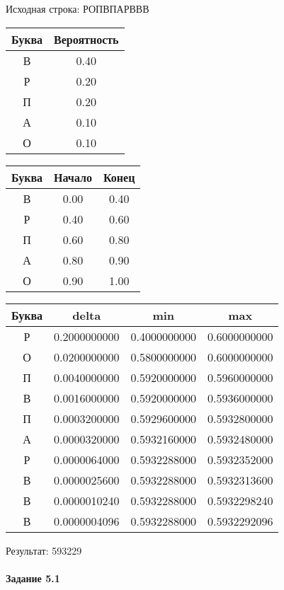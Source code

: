 \documentclass[a4paper, 12pt]{article}
\begin{document}
Исходная строка: РОПВПАРВВВ\
\begin{center}
 \begin{tabular}{ |c|c| } 
  \hline
     Буква & Вероятность \\ \hline
В & 0.40\\\hline
Р & 0.20\\\hline
П & 0.20\\\hline
А & 0.10\\\hline
О & 0.10
\\ \hline \end{tabular}
\end{center}
\begin{center}
 \begin{tabular}{ |c|c|c| } 
  \hline
     Буква & Начало & Конец \\ \hline
В & 0.00 & 0.40\\\hline
Р & 0.40 & 0.60\\\hline
П & 0.60 & 0.80\\\hline
А & 0.80 & 0.90\\\hline
О & 0.90 & 1.00
\\ \hline \end{tabular}
\end{center}
\begin{center}
 \begin{tabular}{ |c|c|c|c| } 
  \hline
     Буква & delta & min & max \\ \hline
Р & 0.2000000000 & 0.4000000000 & 0.6000000000\\\hline
О & 0.0200000000 & 0.5800000000 & 0.6000000000\\\hline
П & 0.0040000000 & 0.5920000000 & 0.5960000000\\\hline
В & 0.0016000000 & 0.5920000000 & 0.5936000000\\\hline
П & 0.0003200000 & 0.5929600000 & 0.5932800000\\\hline
А & 0.0000320000 & 0.5932160000 & 0.5932480000\\\hline
Р & 0.0000064000 & 0.5932288000 & 0.5932352000\\\hline
В & 0.0000025600 & 0.5932288000 & 0.5932313600\\\hline
В & 0.0000010240 & 0.5932288000 & 0.5932298240\\\hline
В & 0.0000004096 & 0.5932288000 & 0.5932292096
\\ \hline \end{tabular}
\end{center}
Результат: 593229
\pagebreak
\paragraph{Задание 5.1 \\
}
\end{document}
